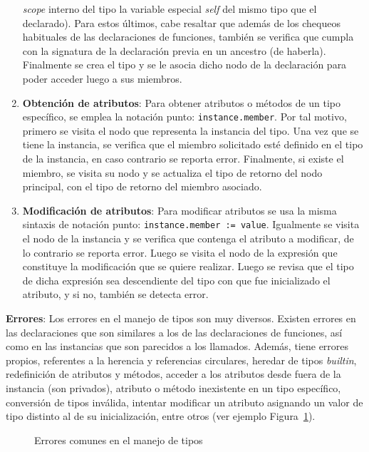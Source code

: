 \documentclass{llncs}
\begin{document}
\begin{enumerate}
    \textit{scope} interno del tipo la variable especial \textit{self} del mismo tipo que el declarado). Para estos últimos, cabe resaltar que además de los chequeos habituales de las declaraciones de funciones, también se verifica que cumpla con la signatura de la declaración previa en
    un ancestro (de haberla). Finalmente se crea el tipo y se le asocia dicho nodo de la declaración para poder acceder luego a sus miembros.
    \item \textbf{Obtención de atributos}: Para obtener atributos o métodos de un tipo específico, se emplea la notación punto: \texttt{instance.member}. Por tal motivo, primero se visita el nodo que representa la instancia del tipo. Una vez que se tiene la instancia, se verifica que el miembro 
    solicitado esté definido en el tipo de la instancia, en caso contrario se reporta error. Finalmente, si existe el miembro, se visita su nodo y se actualiza el tipo de retorno del nodo principal, con el tipo de retorno del miembro asociado.
    \item \textbf{Modificación de atributos}: Para modificar atributos se usa la misma sintaxis de notación punto: \texttt{instance.member := value}. Igualmente se visita el nodo de la instancia y se verifica que contenga el atributo a modificar, de lo contrario se reporta error. Luego 
    se visita el nodo de la expresión que constituye la modificación que se quiere realizar. Luego se revisa que el tipo de dicha expresión sea descendiente del tipo con que fue inicializado el atributo, y si no, también se detecta error.
\end{enumerate}

\textbf{Errores}: Los errores en el manejo de tipos son muy diversos. Existen errores en las declaraciones que son similares a los de las declaraciones de funciones, así como en las instancias que son parecidos a los llamados. Además, tiene errores propios, referentes a la herencia y referencias circulares, 
heredar de tipos \textit{builtin}, redefinición de atributos y métodos, acceder a los atributos desde fuera de la instancia (son privados), atributo o método inexistente en un tipo específico, conversión de tipos inválida, intentar modificar un atributo asignando un valor de tipo distinto al de su inicialización, 
entre otros (ver ejemplo Figura~\ref{fig:errores_5}).
\begin{figure}[h]
\centering
\caption{Errores comunes en el manejo de tipos}
\label{fig:errores_5}
\end{figure}
\end{document}
